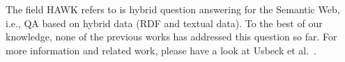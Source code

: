 The field HAWK refers to is hybrid question answering for the Semantic Web, i.e., QA based on hybrid data (RDF and textual data).
To the best of our knowledge, none of the previous works has addressed this question so far.
For more information and related work, please have a look at Usbeck et al.~\cite{hawk_2015}.
